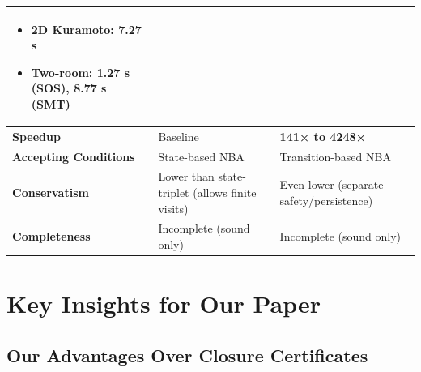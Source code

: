 \documentclass{article}
\begin{document}
\begin{center}
\begin{tabular}{|p{4cm}|p{5cm}|p{5cm}|}
\begin{itemize}
\item 2D Kuramoto: 7.27 s
\item Two-room: 1.27 s (SOS), 8.77 s (SMT)
\end{itemize} \\
\hline
\textbf{Speedup} & Baseline & \textbf{141× to 4248×} \\
\hline
\textbf{Accepting Conditions} & State-based NBA & Transition-based NBA \\
\hline
\textbf{Conservatism} & Lower than state-triplet (allows finite visits) & Even lower (separate safety/persistence) \\
\hline
\textbf{Completeness} & Incomplete (sound only) & Incomplete (sound only) \\
\hline
\end{tabular}
\end{center}

\section{Key Insights for Our Paper}

\subsection{Our Advantages Over Closure Certificates}
\end{document}
